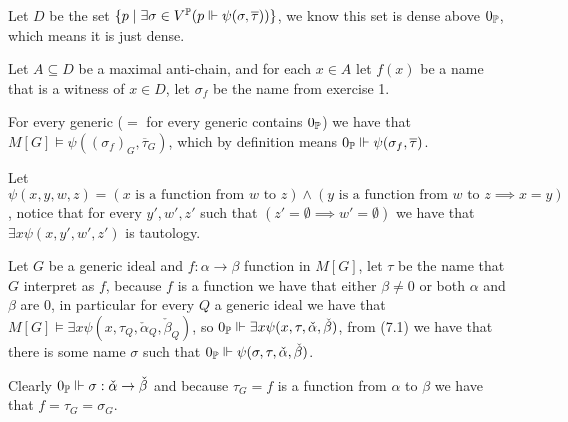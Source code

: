 \begin{cExercise}[][][author][7]
	\begin{cPart}
		Let $D$ be the set $\{p\mid \exists \sigma\in V^\Bbb P (p\Vdash \psi(\sigma, \overline{\tau}))\}$, we know this set is dense above $0_\Bbb P$, which means it is just dense.
		
		Let $A\subseteq D$ be a maximal anti-chain, and for each $x\in A$ let $f(x)$ be a name that is a witness of $x\in D$, let $\sigma_f$ be the name from exercise 1.
		
		For every generic ($=$ for every generic contains $0_\Bbb P$) we have that $M[G]\models \psi((\sigma_f)_G,\overline{\tau}_G)$, which by definition means $0_\Bbb P\Vdash \psi(\sigma_f, \overline{\tau})$.
	\end{cPart}
	\begin{cPart}
		Let $\psi(x,y,w,z)=(x \text{ is a function from $w$ to $z$})\land (y\text{ is a function from $w$ to $z$}\implies x=y)$, notice that for every $y',w',z'$ such that $(z'=\emptyset\implies w'=\emptyset)$ we have that $\exists x\psi(x,y',w',z')$ is tautology.
		
		Let $G$ be a generic ideal and $f:\alpha\to\beta$ function in $M[G]$, let $\tau$ be the name that $G$ interpret as $f$, because $f$ is a function we have that either $\beta\ne 0$ or both $\alpha$ and $\beta$ are $0$, in particular for every $Q$ a generic ideal we have that $M[G]\models\exists x\psi(x,\tau_Q,\check{\alpha}_Q,\check{\beta}_Q)$, so $0_\Bbb P\Vdash \exists x\psi(x,\tau,\check{\alpha},\check{\beta})$, from (7.1) we have that there is some name $\sigma$ such that $0_\Bbb P\Vdash \psi(\sigma,\tau,\check{\alpha},\check{\beta})$.
		
		Clearly $0_\Bbb P\Vdash \sigma:\check{\alpha}\to\check{\beta}$ and because $\tau_G=f$ is a function from $\alpha$ to $\beta$ we have that $f=\tau_G=\sigma_G$.
	\end{cPart}
\end{cExercise}
